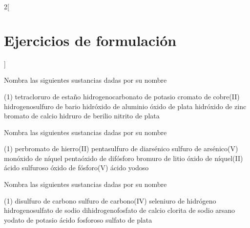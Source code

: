 \documentclass[10pt]{article}
\begin{document}
\begin{multicols}{2}[
  \section{Ejercicios de formulación}
  ]

  \begin{exercise}[
      tags    = {inorgánica,formulación,múltiple,2B},
      topics  = {química inorgánica,formulación,nomenclatura},
      source  = {Química 2B SAN 2016, p372, e12},
    ]

    Nombra las siguientes sustancias dadas por su nombre

    \begin{tasks}(1)
      \task tetracloruro de estaño
      \task hidrogenocarbonato de potasio
      \task cromato de cobre(II)
      \task hidrogenosulfuro de bario
      \task hidróxido de aluminio
      \task óxido de plata
      \task hidróxido de zinc
      \task bromato de calcio
      \task hidruro de berilio
      \task nitrito de plata
    \end{tasks}
  \end{exercise}


  \begin{exercise}[
      tags    = {inorgánica,formulación,múltiple,2B},
      topics  = {química inorgánica,formulación,nomenclatura},
      source  = {Química 2B SAN 2016, p372, e13},
    ]

    Nombra las siguientes sustancias dadas por su nombre

    \begin{tasks}(1)
      \task perbromato de hierro(II)
      \task pentasulfuro de diarsénico
      \task sulfuro de arsénico(V)
      \task monóxido de níquel
      \task pentaóxido de difósforo
      \task bromuro de litio
      \task óxido de níquel(II)
      \task ácido sulfuroso
      \task óxido de fósforo(V)
      \task ácido yodoso
    \end{tasks}
  \end{exercise}

  \begin{exercise}[
      tags    = {inorgánica,formulación,múltiple,2B},
      topics  = {química inorgánica,formulación,nomenclatura},
      source  = {Química 2B SAN 2016, p372, e14},
    ]

    Nombra las siguientes sustancias dadas por su nombre

    \begin{tasks}(1)
      \task disulfuro de carbono
      \task sulfuro de carbono(IV)
      \task seleniuro de hidrógeno
      \task hidrogenosulfato de sodio
      \task dihidrogenofosfato de calcio
      \task clorita de sodio
      \task arsano
      \task yodato de potasio
      \task ácido fosforoso
      \task sulfato de plata
    \end{tasks}
  \end{exercise}



\end{multicols}
\end{document}
